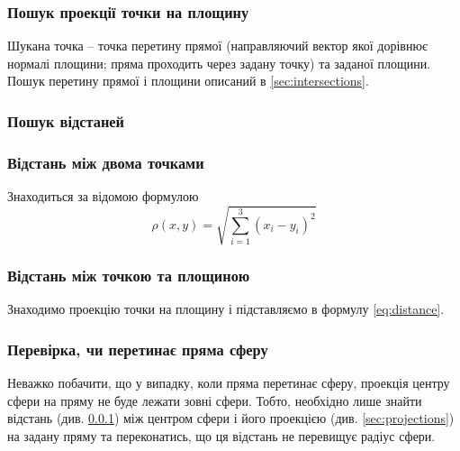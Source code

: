 \documentclass[a4paper,12pt]{article}
\begin{document}
\subsubsection*{Пошук проекції точки на площину}
Шукана точка -- точка перетину прямої (направляючий вектор якої дорівнює нормалі площини; пряма проходить через задану точку) та заданої площини. Пошук перетину прямої і площини описаний в \ref{sec:intersections}.

\subsubsection{Пошук відстаней} \label{sec:distance}
\subsubsection*{Відстань між двома точками}

Знаходиться за відомою формулою
\begin{equation} \label{eq:distance}
  \rho(x,y) = \sqrt{\sum \limits_{i=1}^3 (x_i - y_i)^2}
\end{equation}

\subsubsection*{Відстань між точкою та площиною}

Знаходимо проекцію точки на площину і підставляємо в формулу \ref{eq:distance}.

\subsubsection{Перевірка, чи перетинає пряма сферу}
Неважко побачити, що у випадку, коли пряма перетинає сферу, проекція центру сфери на пряму не буде лежати зовні сфери. Тобто, необхідно лише знайти відстань (див. \ref{sec:distance}) між центром сфери і його проекцією (див. \ref{sec:projections}) на задану пряму та переконатись, що ця відстань не перевищує радіус сфери.
\end{document}
